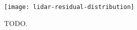 \begin{figure}
  \centering
  \texttt{[image: lidar-residual-distribution]}
  \caption{%
    TODO.
  }%
  \label{fig:lidar-residual-distribution}
\end{figure}
%
